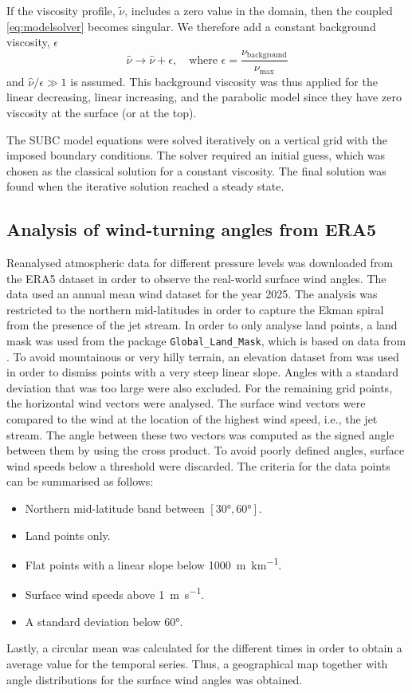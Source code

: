 If the viscosity profile, $\tilde\nu$, includes a zero value in the domain, then the coupled \autoref{eq:modelsolver} becomes singular. We therefore add a constant background viscosity, $\epsilon$
\begin{equation}
    \hat{\nu}\rightarrow\hat{\nu}+\epsilon, \quad \text{where } \epsilon=\frac{\nu_\text{background}}{\nu_\text{max}}
\end{equation}
and $\hat{\nu}/\epsilon\gg1$ is assumed. This background viscosity was thus applied for the linear decreasing, linear increasing, and the parabolic model since they have zero viscosity at the surface (or at the top).

The SUBC model equations were solved iteratively on a vertical grid with the imposed boundary conditions. The solver required an initial guess, which was chosen as the classical solution for a constant viscosity. The final solution was found when the iterative solution reached a steady state.

\subsection{Analysis of wind-turning angles from ERA5}
Reanalysed atmospheric data for different pressure levels was downloaded from the ERA5 dataset \citep{copernicusclimatechangeservice2019} in order to observe the real-world surface wind angles. The data used an annual mean wind dataset for the year 2025. The analysis was restricted to the northern mid-latitudes in order to capture the Ekman spiral from the presence of the jet stream. In order to only analyse land points, a land mask was used from the package \texttt{Global\_Land\_Mask}, which is based on data from \citet{noaanationalcentersforenvironmentalinformation1999}. To avoid mountainous or very hilly terrain, an elevation dataset from \citet{noaanationalcentersforenvironmentalinformation2022} was used in order to dismiss points with a very steep linear slope. Angles with a standard deviation that was too large were also excluded. For the remaining grid points, the horizontal wind vectors were analysed. The surface wind vectors were compared to the wind at the location of the highest wind speed, i.e., the jet stream. The angle between these two vectors was computed as the signed angle between them by using the cross product. To avoid poorly defined angles, surface wind speeds below a threshold were discarded. The criteria for the data points can be summarised as follows:
\begin{itemize}
\item Northern mid-latitude band between $\left[\ang{30}, \ang{60}\right]$.
\item Land points only.
\item Flat points with a linear slope below \SI{1000}{\meter\per\kilo\meter}.
\item Surface wind speeds above \SI{1}{\meter\per\second}.
\item A standard deviation below \ang{60}. 
\end{itemize}
Lastly, a circular mean was calculated for the different times in order to obtain a average value for the temporal series. Thus, a geographical map together with angle distributions for the surface wind angles was obtained.